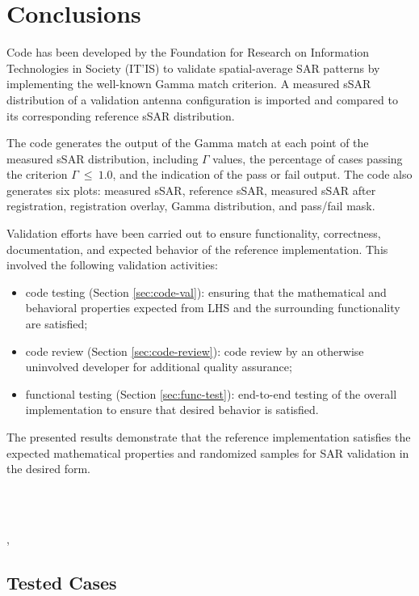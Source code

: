\documentclass{./class/itisreport}
\newcommand{\printbibliography}{}%
\begin{document}
\FloatBarrier
\clearpage
\section{Conclusions \label{sec:conclusions}}

Code has been developed by the Foundation for Research on Information Technologies in Society (IT'IS) to validate spatial-average SAR patterns by implementing the well-known Gamma match criterion. A measured sSAR distribution of a validation antenna configuration is imported and compared to its corresponding reference sSAR distribution. 

The code generates the output of the Gamma match at each point of the measured sSAR distribution, including $\Gamma$ values, the percentage of cases passing the criterion $\Gamma~\leq~1.0$, and the indication of the pass or fail output. The code also generates six plots: measured sSAR, reference sSAR, measured sSAR after registration, registration overlay, Gamma distribution, and pass/fail mask.

Validation efforts have been carried out to ensure functionality, correctness, documentation, and expected behavior of the reference implementation. This involved the following validation activities:
\begin{itemize}
\item code testing (Section \ref{sec:code-val}): ensuring that the mathematical and behavioral properties expected from LHS and the surrounding functionality are satisfied;
\item code review (Section \ref{sec:code-review}): code review by an otherwise uninvolved developer for additional quality assurance;
\item functional testing (Section \ref{sec:func-test}): end-to-end testing of the overall implementation to ensure that desired behavior is satisfied.
\end{itemize}

The presented results demonstrate that the reference implementation satisfies the expected mathematical properties and randomized samples for SAR validation in the desired form.


\ \\ \vspace{3cm} \ \\  \vspace{-1ex}

\hspace*{\fill} \authorname, \reportdate
\vspace{3cm}

\clearpage
\newpage
\printbibliography

\begin{appendix}
\section{Tested Cases}
%
\end{appendix}
\end{document}

